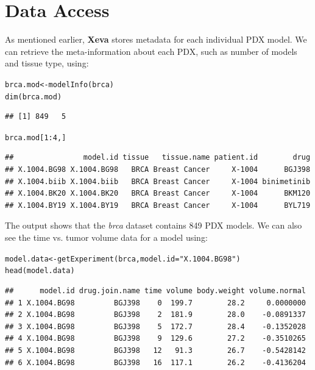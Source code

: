 \documentclass{article}\usepackage[]{graphicx}\usepackage[usenames,dvipsnames]{color}
\newcommand{\hlnum}[1]{\textcolor[rgb]{0.816,0.125,0.439}{#1}}%
\newcommand{\hlstr}[1]{\textcolor[rgb]{0.251,0.627,0.251}{#1}}%
\newcommand{\hlopt}[1]{\textcolor[rgb]{0,0,0}{#1}}%
\newcommand{\hlstd}[1]{\textcolor[rgb]{0.251,0.251,0.251}{#1}}%
\newcommand{\hlkwb}[1]{\textcolor[rgb]{0,0,0}{#1}}%
\newcommand{\hlkwc}[1]{\textcolor[rgb]{0.251,0.251,0.251}{#1}}%
\newcommand{\hlkwd}[1]{\textcolor[rgb]{0.878,0.439,0.125}{#1}}%
\newenvironment{knitrout}{}{} %
\begin{document}
\section{Data Access}
As mentioned earlier, \textbf{Xeva} stores metadata for each individual PDX model.
We can retrieve the meta-information about each PDX, such as number of models and tissue type, using:
\begin{knitrout}
\color{fgcolor}\begin{kframe}
\begin{alltt}
\hlstd{brca.mod} \hlkwb{<-} \hlkwd{modelInfo}\hlstd{(brca)}
\hlkwd{dim}\hlstd{(brca.mod)}
\end{alltt}
\begin{verbatim}
## [1] 849   5
\end{verbatim}
\begin{alltt}
\hlstd{brca.mod[}\hlnum{1}\hlopt{:}\hlnum{4}\hlstd{, ]}
\end{alltt}
\begin{verbatim}
##                model.id tissue   tissue.name patient.id        drug
## X.1004.BG98 X.1004.BG98   BRCA Breast Cancer     X-1004      BGJ398
## X.1004.biib X.1004.biib   BRCA Breast Cancer     X-1004 binimetinib
## X.1004.BK20 X.1004.BK20   BRCA Breast Cancer     X-1004      BKM120
## X.1004.BY19 X.1004.BY19   BRCA Breast Cancer     X-1004      BYL719
\end{verbatim}
\end{kframe}
\end{knitrout}
The output shows that the \textit{brca} dataset contains 849 PDX models.
We can also see the time vs. tumor volume data for a model using:

\begin{knitrout}
\color{fgcolor}\begin{kframe}
\begin{alltt}
\hlstd{model.data} \hlkwb{<-} \hlkwd{getExperiment}\hlstd{(brca,} \hlkwc{model.id} \hlstd{=} \hlstr{"X.1004.BG98"}\hlstd{)}
\hlkwd{head}\hlstd{(model.data)}
\end{alltt}
\begin{verbatim}
##      model.id drug.join.name time volume body.weight volume.normal
## 1 X.1004.BG98         BGJ398    0  199.7        28.2     0.0000000
## 2 X.1004.BG98         BGJ398    2  181.9        28.0    -0.0891337
## 3 X.1004.BG98         BGJ398    5  172.7        28.4    -0.1352028
## 4 X.1004.BG98         BGJ398    9  129.6        27.2    -0.3510265
## 5 X.1004.BG98         BGJ398   12   91.3        26.7    -0.5428142
## 6 X.1004.BG98         BGJ398   16  117.1        26.2    -0.4136204
\end{verbatim}
\end{kframe}
\end{knitrout}
\end{document}
